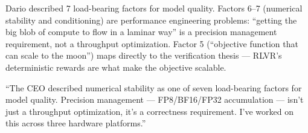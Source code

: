Dario described 7 load-bearing factors for model quality. Factors 6--7 (numerical stability and conditioning) are performance engineering problems: ``getting the big blob of compute to flow in a laminar way'' is a precision management requirement, not a throughput optimization. Factor 5 (``objective function that can scale to the moon'') maps directly to the verification thesis --- RLVR's deterministic rewards are what make the objective scalable.

\begin{sayit}
``The CEO described numerical stability as one of seven load-bearing factors for model quality. Precision management --- FP8/BF16/FP32 accumulation --- isn't just a throughput optimization, it's a correctness requirement. I've worked on this across three hardware platforms.''
\end{sayit}

